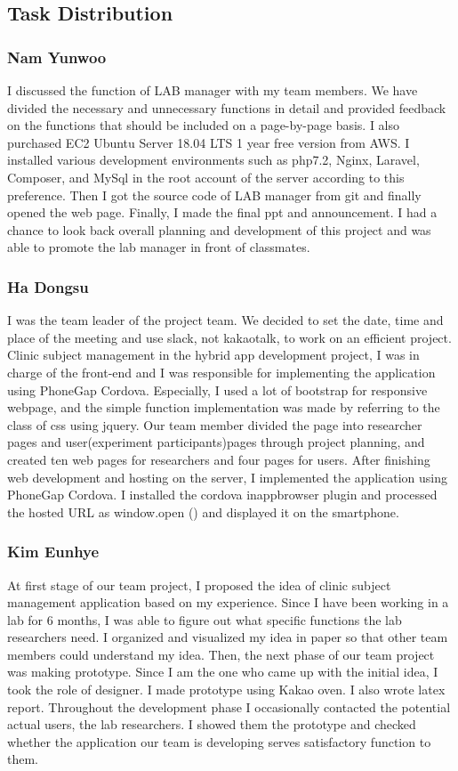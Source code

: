 \documentclass[letterpaper, 10 pt, conference]{ieeeconf}  %
\begin{document}
\subsection{Task Distribution}
\subsubsection{Nam Yunwoo}
 I discussed the function of LAB manager with my team members. We have divided the necessary and unnecessary functions in detail and provided feedback on the functions that should be included on a page-by-page basis.
I also purchased EC2 Ubuntu Server 18.04 LTS 1 year free version from AWS. I installed various development environments such as php7.2, Nginx, Laravel, Composer, and MySql in the root account of the server according to this preference. Then I got the source code of LAB manager from git and finally opened the web page.
Finally, I made the final ppt and announcement. I had a chance to look back overall planning and development of this project and was able to promote the lab manager in front of classmates.\\
\subsubsection{Ha Dongsu}
I was the team leader of the project team. We decided to set the date, time and place of the meeting and use slack, not kakaotalk, to work on an efficient project.
Clinic subject management in the hybrid app development project, I was in charge of the front-end and I was responsible for implementing the application using PhoneGap Cordova. Especially, I used a lot of bootstrap for responsive webpage, and the simple function implementation was made by referring to the class of css using jquery. Our team member divided the page into researcher pages and user(experiment participants)pages through project planning, and created ten web pages for researchers and four pages for users. After finishing web development and hosting on the server, I implemented the application using PhoneGap Cordova. I installed the cordova inappbrowser plugin and processed the hosted URL as window.open () and displayed it on the smartphone.\\
\subsubsection{Kim Eunhye}
At first stage of our team project, I proposed the idea of clinic subject management application based on my experience. Since I have been working in a lab for 6 months, I was able to figure out what specific functions the lab researchers need. I organized  and visualized my idea in paper so that other team members could understand my idea. Then, the next phase of our team project was making prototype. Since I am the one who came up with the initial idea, I took the role of designer. I made prototype using Kakao oven. I also wrote latex report. Throughout the development phase I occasionally contacted the potential actual users, the lab researchers. I showed them the prototype and checked whether the application our team is developing serves satisfactory function to them.\\
\end{document}
